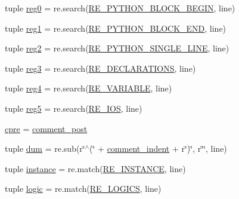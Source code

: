 \begin{DoxyCompactItemize}
\item 
tuple \hyperlink{namespaceverilog__generator_aa0a59f9d26b1ec9895aaef184d00d045}{reg0} = re.\-search(\hyperlink{namespaceverilog__generator_aaa6dff7070364c2a3d96814f1efc53e8}{R\-E\-\_\-\-P\-Y\-T\-H\-O\-N\-\_\-\-B\-L\-O\-C\-K\-\_\-\-B\-E\-G\-I\-N}, line)
\item 
tuple \hyperlink{namespaceverilog__generator_a7f900619fa2fade7a25b6a381d043e00}{reg1} = re.\-search(\hyperlink{namespaceverilog__generator_a2349535564e100a6d65a2146bf0f8bbd}{R\-E\-\_\-\-P\-Y\-T\-H\-O\-N\-\_\-\-B\-L\-O\-C\-K\-\_\-\-E\-N\-D}, line)
\item 
tuple \hyperlink{namespaceverilog__generator_a6b3383556e2c69bec3df7179edb9abd5}{reg2} = re.\-search(\hyperlink{namespaceverilog__generator_aa77385c9f3ed119e28172c750844d448}{R\-E\-\_\-\-P\-Y\-T\-H\-O\-N\-\_\-\-S\-I\-N\-G\-L\-E\-\_\-\-L\-I\-N\-E}, line)
\item 
tuple \hyperlink{namespaceverilog__generator_a67d70c910cdff4ddb30f5578ec4b4593}{reg3} = re.\-search(\hyperlink{namespaceverilog__generator_a17458264d0df5cb836d925e8cf2ec56f}{R\-E\-\_\-\-D\-E\-C\-L\-A\-R\-A\-T\-I\-O\-N\-S}, line)
\item 
tuple \hyperlink{namespaceverilog__generator_a1e0b192cfe4308b8276b1dd2e4b84812}{reg4} = re.\-search(\hyperlink{namespaceverilog__generator_ac42330437a8a95b3a482073d5c6791d3}{R\-E\-\_\-\-V\-A\-R\-I\-A\-B\-L\-E}, line)
\item 
tuple \hyperlink{namespaceverilog__generator_a206dc8afa200c2596681d5f885a8d1df}{reg5} = re.\-search(\hyperlink{namespaceverilog__generator_ac53d8e583f512c430c2e1c3ddff585e4}{R\-E\-\_\-\-I\-O\-S}, line)
\item 
\hyperlink{namespaceverilog__generator_ae3ef6869003c4cba069f0d66aedee089}{cpre} = \hyperlink{namespaceverilog__generator_acd9d3d9939ee9a02315fa72596bcb584}{comment\-\_\-post}
\item 
tuple \hyperlink{namespaceverilog__generator_a8d95b4550b774331a0bbcd9fa6fdd934}{dum} = re.\-sub(r\char`\"{}$^\wedge$(\char`\"{} + \hyperlink{namespaceverilog__generator_aba79d1c3e3b9be44f11728cd35c6e73c}{comment\-\_\-indent} + r\char`\"{})\char`\"{}, r\char`\"{}\char`\"{}, line)
\item 
tuple \hyperlink{namespaceverilog__generator_a90dad455f6c0ec9127df51647fb1380f}{instance} = re.\-match(\hyperlink{namespaceverilog__generator_ac2a164628a1ed9048df4807c3e001bd2}{R\-E\-\_\-\-I\-N\-S\-T\-A\-N\-C\-E}, line)
\item 
tuple \hyperlink{namespaceverilog__generator_a2e8bc766afc3a7055490c6df1b89960f}{logic} = re.\-match(\hyperlink{namespaceverilog__generator_a767602e234555709fb8829fe493912ff}{R\-E\-\_\-\-L\-O\-G\-I\-C\-S}, line)

\end{DoxyCompactItemize}

